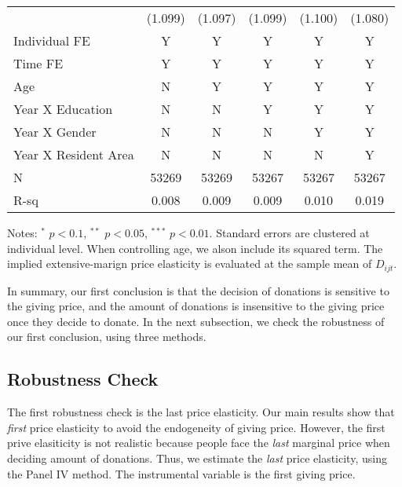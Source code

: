 \documentclass[
]{article}
\begin{document}
\begin{table}
\begin{threeparttable}
\begin{tabular}[t]{lccccc}
\hspace{1em} & (1.099) & (1.097) & (1.099) & (1.100) & (1.080)\\
\hspace{1em}Individual FE & Y & Y & Y & Y & Y\\
\hspace{1em}Time FE & Y & Y & Y & Y & Y\\
\hspace{1em}Age & N & Y & Y & Y & Y\\
\hspace{1em}Year X Education & N & N & Y & Y & Y\\
\hspace{1em}Year X Gender & N & N & N & Y & Y\\
\hspace{1em}Year X Resident Area & N & N & N & N & Y\\
\hspace{1em}N & 53269 & 53269 & 53267 & 53267 & 53267\\
\hspace{1em}R-sq & 0.008 & 0.009 & 0.009 & 0.010 & 0.019\\
\bottomrule
\end{tabular}
\begin{tablenotes}
\item Notes: $^{*}$ $p < 0.1$, $^{**}$ $p < 0.05$, $^{***}$ $p < 0.01$. Standard errors are clustered at individual level. When controlling age, we alson include its squared term. The implied extensive-marign price elasticity is evaluated at the sample mean of $D_{ijt}$.
\end{tablenotes}
\end{threeparttable}
\end{table}

In summary, our first conclusion is that
the decision of donations is sensitive to the giving price,
and the amount of donations is insensitive to the giving price once they decide to donate.
In the next subsection, we check the robustness of our first conclusion, using three methods.

\hypertarget{robustness-check}{%
\subsection{Robustness Check}\label{robustness-check}}

The first robustness check is the last price elasticity.
Our main results show that \emph{first} price elasticity to avoid the endogeneity of giving price.
However, the first prive elasiticity is not realistic
because people face the \emph{last} marginal price when deciding amount of donations.
Thus, we estimate the \emph{last} price elasticity, using the Panel IV method.
The instrumental variable is the first giving price.
\end{document}
